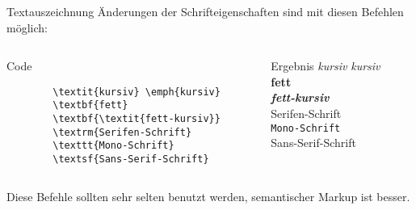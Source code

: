 \begin{frame}[fragile]{Textauszeichnung}
  Änderungen der Schrifteigenschaften sind mit diesen Befehlen möglich:
  \begin{columns}[onlytextwidth, t]
    \begin{column}{0.60\textwidth}
      \begin{block}{Code}
        \begin{lstlisting}
        \textit{kursiv} \emph{kursiv}
        \textbf{fett}
        \textbf{\textit{fett-kursiv}}
        \textrm{Serifen-Schrift}
        \texttt{Mono-Schrift}
        \textsf{Sans-Serif-Schrift}
        \end{lstlisting}
      \end{block}
    \end{column}
    \begin{column}{0.36\textwidth}
      \begin{block}{Ergebnis}
        \textit{kursiv} \emph{kursiv} \\
        \textbf{fett} \\
        \textbf{\textit{fett-kursiv}} \\
        \textrm{Serifen-Schrift} \\
        \texttt{Mono-Schrift} \\
        \textsf{Sans-Serif-Schrift}
      \end{block}
    \end{column}
  \end{columns}

  \vspace{1em}
  Diese Befehle sollten sehr selten benutzt werden, semantischer Markup ist besser.
\end{frame}

